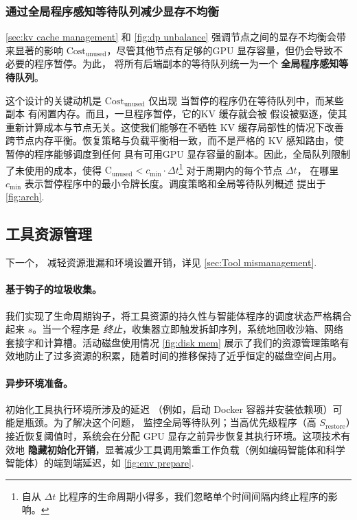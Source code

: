 \subsubsection{通过全局程序感知等待队列减少显存不均衡}
\autoref{sec:kv cache management} 和 \autoref{fig:dp unbalance} 强调节点之间的显存不均衡会带来显著的影响 $\text{Cost}_{\text{unused}}$，尽管其他节点有足够的GPU 显存容量，但仍会导致不必要的程序暂停。为此， \ouralg 将所有后端副本的等待队列统一为一个 \textbf{全局程序感知等待队列}。

这个设计的关键动机是 $\text{Cost}_{\text{unused}}$ 仅出现
当暂停的程序仍在等待队列中，而某些副本
有闲置内存。而且，一旦程序暂停，它的KV 缓存就会被
假设被驱逐，使其重新计算成本与节点无关。这使我们能够在不牺牲 KV 缓存局部性的情况下改善跨节点内存平衡。恢复策略与负载平衡相一致，而不是严格的 KV 感知路由，使暂停的程序能够调度到任何
具有可用GPU 显存容量的副本。因此，全局队列限制了未使用的成本，使得 $\text{C}_{\text{unused}} < c_{\mathrm{min}} \cdot \Delta t$\footnote{自从 $\Delta t$ 比程序的生命周期小得多，我们忽略单个时间间隔内终止程序的影响。} 对于周期内的每个节点 $\Delta t$， 在哪里 $c_{\mathrm{min}}$ 表示暂停程序中的最小令牌长度。调度策略和全局等待队列概述 \ouralg 提出于 \autoref{fig:arch}.

\subsection{工具资源管理}
\label{sec:tool_resource}
下一个， \ouralg 减轻资源泄漏和环境设置开销，详见 \autoref{sec:Tool mismanagement}.
\paragraph{基于钩子的垃圾收集。} 我们实现了生命周期钩子，将工具资源的持久性与智能体程序的调度状态严格耦合起来 $s$。当一个程序是 \textit{终止}，收集器立即触发拆卸序列，系统地回收沙箱、网络套接字和计算槽。活动磁盘使用情况 \autoref{fig:disk mem} 展示了我们的资源管理策略有效地防止了过多资源的积累，随着时间的推移保持了近乎恒定的磁盘空间占用。


\paragraph{异步环境准备。} 初始化工具执行环境所涉及的延迟
 （例如，启动 Docker 容器并安装依赖项）可能是瓶颈。为了解决这个问题， \ouralg 监控全局等待队列；当高优先级程序（高 $S_\text{restore}$）接近恢复阈值时，系统会在分配 GPU 显存之前异步恢复其执行环境。这项技术有效地 \textbf{隐藏初始化开销}，显著减少工具调用繁重工作负载（例如编码智能体和科学智能体）的端到端延迟，如 \autoref{fig:env prepare}.
